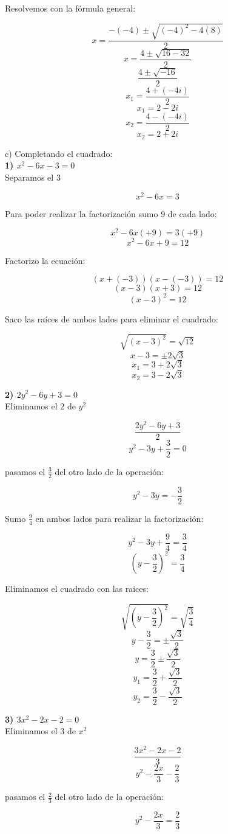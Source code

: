 \documentclass[11pt]{report}
\begin{document}
\indent Resolvemos con la fórmula general:

$$x=\frac{ -(-4)\pm \sqrt{(-4)^{2}-4(8)} }{ 2 }$$
$$x=\frac{4 \pm \sqrt{16-32}}{2}$$
$$\frac{4 \pm \sqrt{-16}}{2}$$
$$x_1=\frac{4+(-4i)}{2}$$
$$x_1=2-2i$$
$$x_2=\frac{4-(-4i)}{2}$$
$$x_2=2+2i$$

c) Completando el cuadrado:\\[2mm]
\indent \textbf { 1) $x^{2}-6x-3=0$ }\\[2mm]
\indent Separamos el 3

$$x^{2}-6x=3$$

\indent Para poder realizar la factorización sumo 9 de cada lado:

$$x^{2}-6x(+9)=3(+9)$$
$$x^{2}-6x+9=12$$

\indent Factorizo la ecuación:

$$(x+(-3))(x-(-3))=12$$
$$(x-3)(x+3)=12$$
$$(x-3)^{2}=12$$

\indent Saco las raíces de ambos lados para eliminar el cuadrado:

$$\sqrt{(x-3)^{2}}=\sqrt{12}$$
$$x-3=\pm 2\sqrt{3}$$
$$x_1=3+2\sqrt{3}$$
$$x_2=3-2\sqrt{3}$$

\indent \textbf { 2) $2y^{2}-6y+3=0$ }\\[2mm]
\indent Eliminamos el $2$ de $y^2$

$$\frac{2y^{2}-6y+3}{2}$$
$$y^{2}-3y+\frac{3}{2}=0$$

\indent pasamos el $\frac{3}{2}$ del otro lado de la operación:

$$y^{2}-3y=-\frac{3}{2}$$

\indent Sumo $\frac{9}{4}$ en ambos lados para realizar la factorización:

$$y^{2}-3y+\frac{9}{4}=\frac{3}{4}$$
$$\left(y-\frac{3}{2}\right)^{2}=\frac{3}{4}$$

\indent Eliminamos el cuadrado con las raices:

$$\sqrt{\left(y-\frac{3}{2}\right)^{2}}=\sqrt{\frac{3}{4}}$$
$$y-\frac{3}{2}=\pm \frac{\sqrt{3}}{2}$$
$$y=\frac{3}{2}\pm \frac{\sqrt{3}}{2}$$
$$y_1=\frac{3}{2}+\frac{\sqrt{3}}{2}$$
$$y_2=\frac{3}{2}-\frac{\sqrt{3}}{2}$$

\indent \textbf { 3) $3x^{2}-2x-2=0$ }\\[2mm]
\indent Eliminamos el $3$ de $x^2$

$$\frac{3x^{2}-2x-2}{3}$$
$$y^2-\frac{2x}{3}-\frac{2}{3}$$

\indent pasamos el $\frac{2}{3}$ del otro lado de la operación:

$$y^2-\frac{2x}{3}=\frac{2}{3}$$
\end{document}

